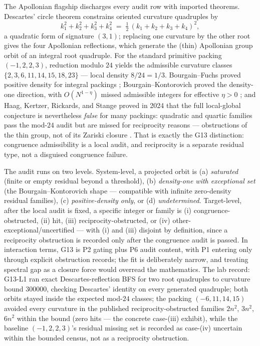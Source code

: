 \documentclass[11pt]{article}
\theoremstyle{definition}
\begin{document}
The Apollonian flagship discharges every audit row with imported theorems. Descartes' circle theorem
constrains oriented curvature quadruples by
\[
  k_1^2 + k_2^2 + k_3^2 + k_4^2 \;=\; \tfrac{1}{2}\,(k_1 + k_2 + k_3 + k_4)^2,
\]
a quadratic form of signature $(3,1)$; replacing one curvature by the other root gives the four
Apollonian reflections, which generate the (thin) Apollonian group orbit of an integral root
quadruple. For the standard primitive packing $(-1, 2, 2, 3)$, reduction modulo $24$ yields the
admissible curvature classes $\{2, 3, 6, 11, 14, 15, 18, 23\}$ --- local density $8/24 = 1/3$.
Bourgain--Fuchs proved positive density for integral packings \citep{BourgainFuchs2010};
Bourgain--Kontorovich proved the density-one direction, with $O(N^{1-\eta})$ missed admissible
integers for effective $\eta > 0$ \citep{BourgainKontorovich2014Apollonian}; and Haag, Kertzer,
Rickards, and Stange proved in 2024 that the full local-global conjecture is nevertheless
\emph{false} for many packings: quadratic and quartic families pass the mod-$24$ audit but are missed
for reciprocity reasons --- obstructions of the thin group, not of its Zariski closure
\citep{HaagEtAl2024}. That is exactly the G13 distinction: congruence admissibility is a local audit,
and reciprocity is a separate residual type, not a disguised congruence failure.

The audit runs on two levels. System-level, a projected orbit is (a) \emph{saturated} (finite or
empty residual beyond a threshold), (b) \emph{density-one with exceptional set} (the
Bourgain--Kontorovich shape --- compatible with infinite zero-density residual families), (c)
\emph{positive-density only}, or (d) \emph{undetermined}. Target-level, after the local audit is
fixed, a specific integer or family is (i) congruence-obstructed, (ii) hit, (iii)
reciprocity-obstructed, or (iv) other-exceptional/uncertified --- with (i) and (iii) disjoint by
definition, since a reciprocity obstruction is recorded only after the congruence audit is passed. In
interaction terms, G13 is P2 gating plus P6 audit content, with P1 entering only through explicit
obstruction records; the fit is deliberately narrow, and treating spectral gap as a closure force
would overread the mathematics. The lab record: G13-L1 ran exact Descartes-reflection BFS for two
root quadruples to curvature bound $300000$, checking Descartes' identity on every generated
quadruple; both orbits stayed inside the expected mod-$24$ classes; the packing $(-6, 11, 14, 15)$
avoided every curvature in the published reciprocity-obstructed families $2n^2$, $3n^2$, $6n^2$
within the bound (zero hits --- the concrete case-(iii) exhibit), while the baseline
$(-1, 2, 2, 3)$'s residual missing set is recorded as case-(iv) uncertain within the bounded census,
not as a reciprocity obstruction.
\end{document}
